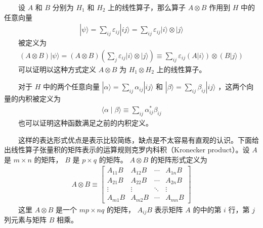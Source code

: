 \documentclass[a4paper,11pt,english]{sphinxmanual}
\begin{document}
\sphinxAtStartPar
  设  \(A\) 和  \(B\) 分别为  \(H_{1}\) 和  \(H_{2}\) 上的线性算子，那么算子 \(A \otimes B\) 作用到  \(H\) 中的任意向量
\begin{equation*}
\begin{split}|\psi\rangle=\sum_{i j} \varepsilon_{i j}|i j\rangle=\sum_{i j} \varepsilon_{i j}|i\rangle \otimes|j\rangle\end{split}
\end{equation*}
\sphinxAtStartPar
  被定义为
\begin{equation*}
\begin{split}(A \otimes B)|\psi\rangle=(A \otimes B)\left(\sum_{\ddot j} \varepsilon_{i j}|i\rangle \otimes|j\rangle\right) \equiv \sum_{i j} \varepsilon_{i j}(A|i\rangle) \otimes(B|j\rangle)\end{split}
\end{equation*}
\sphinxAtStartPar
  可以证明以这种方式定义  \(A \otimes B\) 为  \(H_{1} \otimes H_{2}\) 上的线性算子。

\sphinxAtStartPar
  对于  \(H\) 中的两个任意向量  \(|\alpha\rangle=\sum_{ij} \alpha_{i j}|i j\rangle\) 和  \(|\beta\rangle=\sum_{ij} \beta_{i j}|i j\rangle\) ，这两个向量的内积被定义为
\begin{equation*}
\begin{split}\langle\alpha \mid \beta\rangle \equiv \sum_{i j} \alpha_{i j}^{*} \beta_{i j}\end{split}
\end{equation*}
\sphinxAtStartPar
  也可以证明这种函数满足之前的内积定义。

\sphinxAtStartPar
  这样的表达形式优点是表示比较简练，缺点是不太容易有直观的认识。下面给出线性算子张量积的矩阵表示的运算规则\sphinxhyphen{}克罗内科积（Kronecker product）。设   \(A\) 是   \(m \times n\) 的矩阵，  \(B\) 是  \(p \times q\) 的矩阵。  \(A \otimes B\) 的矩阵形式定义为
\begin{equation*}
\begin{split}A \otimes B \equiv\left[\begin{array}{cccc} A_{11} B & A_{12} B & \cdots & A_{1 n} B \\ A_{21} B & A_{22} B & \cdots & A_{2 n} B \\ \vdots & \vdots & \ddots & \vdots \\ A_{m 1} B & A_{m 2} B & \cdots & A_{m n} B \end{array}\right]\end{split}
\end{equation*}
\sphinxAtStartPar
  这里  \(A \otimes B\) 是一个  \(m p \times n q\) 的矩阵， \(A_{i j} B\) 表示矩阵  \(A\) 的中的第  \(i\) 行，第  \(j\) 列元素与矩阵  \(B\) 相乘。
\end{document}
